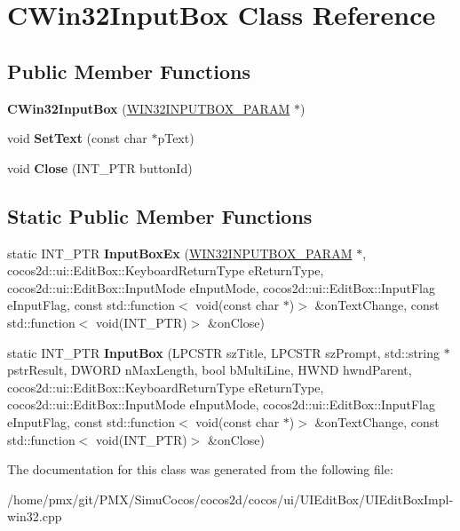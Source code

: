 \hypertarget{classCWin32InputBox}{}\section{C\+Win32\+Input\+Box Class Reference}
\label{classCWin32InputBox}
\subsection*{Public Member Functions}
\begin{DoxyCompactItemize}
\item 
\mbox{\label{classCWin32InputBox_a28e3570fc276787fc9b80405ff132741}} 
{\bfseries C\+Win32\+Input\+Box} (\hyperlink{structWIN32INPUTBOX__PARAM}{W\+I\+N32\+I\+N\+P\+U\+T\+B\+O\+X\+\_\+\+P\+A\+R\+AM} $\ast$)
\item 
\mbox{\label{classCWin32InputBox_a4888a08f78d0c2082164e1c9ecc1ad3a}} 
void {\bfseries Set\+Text} (const char $\ast$p\+Text)
\item 
\mbox{\label{classCWin32InputBox_acf55fb4a04155865ee2e1853b0f3d513}} 
void {\bfseries Close} (I\+N\+T\+\_\+\+P\+TR button\+Id)
\end{DoxyCompactItemize}
\subsection*{Static Public Member Functions}
\begin{DoxyCompactItemize}
\item 
\mbox{\label{classCWin32InputBox_aaeede655d155ebfcebdc78571e74ddcb}} 
static I\+N\+T\+\_\+\+P\+TR {\bfseries Input\+Box\+Ex} (\hyperlink{structWIN32INPUTBOX__PARAM}{W\+I\+N32\+I\+N\+P\+U\+T\+B\+O\+X\+\_\+\+P\+A\+R\+AM} $\ast$, cocos2d\+::ui\+::\+Edit\+Box\+::\+Keyboard\+Return\+Type e\+Return\+Type, cocos2d\+::ui\+::\+Edit\+Box\+::\+Input\+Mode e\+Input\+Mode, cocos2d\+::ui\+::\+Edit\+Box\+::\+Input\+Flag e\+Input\+Flag, const std\+::function$<$ void(const char $\ast$)$>$ \&on\+Text\+Change, const std\+::function$<$ void(I\+N\+T\+\_\+\+P\+TR)$>$ \&on\+Close)
\item 
\mbox{\label{classCWin32InputBox_a52670bf52436a35ddc1b786c4c1b03f3}} 
static I\+N\+T\+\_\+\+P\+TR {\bfseries Input\+Box} (L\+P\+C\+S\+TR sz\+Title, L\+P\+C\+S\+TR sz\+Prompt, std\+::string $\ast$pstr\+Result, D\+W\+O\+RD n\+Max\+Length, bool b\+Multi\+Line, H\+W\+ND hwnd\+Parent, cocos2d\+::ui\+::\+Edit\+Box\+::\+Keyboard\+Return\+Type e\+Return\+Type, cocos2d\+::ui\+::\+Edit\+Box\+::\+Input\+Mode e\+Input\+Mode, cocos2d\+::ui\+::\+Edit\+Box\+::\+Input\+Flag e\+Input\+Flag, const std\+::function$<$ void(const char $\ast$)$>$ \&on\+Text\+Change, const std\+::function$<$ void(I\+N\+T\+\_\+\+P\+TR)$>$ \&on\+Close)
\end{DoxyCompactItemize}


The documentation for this class was generated from the following file\+:\begin{DoxyCompactItemize}
\item 
/home/pmx/git/\+P\+M\+X/\+Simu\+Cocos/cocos2d/cocos/ui/\+U\+I\+Edit\+Box/U\+I\+Edit\+Box\+Impl-\/win32.\+cpp\end{DoxyCompactItemize}
